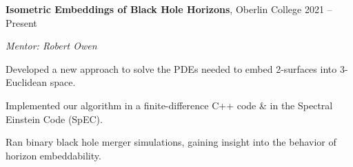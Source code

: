 \begin{entry}
	{{\bf Isometric Embeddings of Black Hole Horizons}, Oberlin College}
	{2021 -- Present}
	
	{\em Mentor: Robert Owen}

	Developed a new approach to solve the PDEs needed to embed 2-surfaces into 3-Euclidean space.

	Implemented our algorithm in a finite-difference C++ code \& in the Spectral Einstein Code (SpEC).

	Ran binary black hole merger simulations, gaining insight into the behavior of horizon embeddability.
\end{entry}
